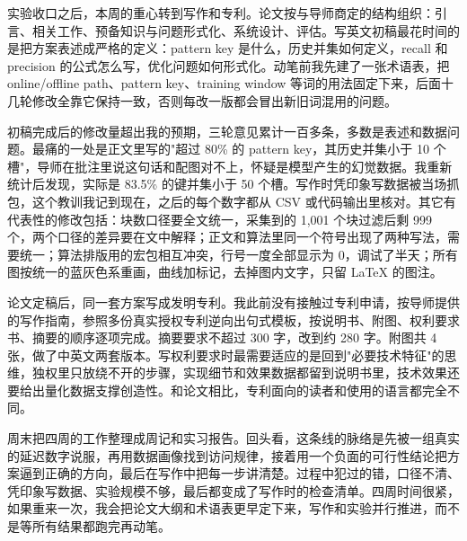 \documentclass[UTF8,fontset=fandol]{ctexart}
\begin{document}

实验收口之后，本周的重心转到写作和专利。论文按与导师商定的结构组织：引言、相关工作、预备知识与问题形式化、系统设计、评估。写英文初稿最花时间的是把方案表述成严格的定义：pattern key 是什么，历史并集如何定义，recall 和 precision 的公式怎么写，优化问题如何形式化。动笔前我先建了一张术语表，把 online/offline path、pattern key、training window 等词的用法固定下来，后面十几轮修改全靠它保持一致，否则每改一版都会冒出新旧词混用的问题。

初稿完成后的修改量超出我的预期，三轮意见累计一百多条，多数是表述和数据问题。最痛的一处是正文里写的"超过 80\% 的 pattern key，其历史并集小于 10 个槽"，导师在批注里说这句话和配图对不上，怀疑是模型产生的幻觉数据。我重新统计后发现，实际是 83.5\% 的键并集小于 50 个槽。写作时凭印象写数据被当场抓包，这个教训我记到现在，之后的每个数字都从 CSV 或代码输出里核对。其它有代表性的修改包括：块数口径要全文统一，采集到的 1,001 个块过滤后剩 999 个，两个口径的差异要在文中解释；正文和算法里同一个符号出现了两种写法，需要统一；算法排版用的宏包相互冲突，行号一度全部显示为 0，调试了半天；所有图按统一的蓝灰色系重画，曲线加标记，去掉图内文字，只留 LaTeX 的图注。

论文定稿后，同一套方案写成发明专利。我此前没有接触过专利申请，按导师提供的写作指南，参照多份真实授权专利逆向出句式模板，按说明书、附图、权利要求书、摘要的顺序逐项完成。摘要要求不超过 300 字，改到约 280 字。附图共 4 张，做了中英文两套版本。写权利要求时最需要适应的是回到"必要技术特征"的思维，独权里只放绕不开的步骤，实现细节和效果数据都留到说明书里，技术效果还要给出量化数据支撑创造性。和论文相比，专利面向的读者和使用的语言都完全不同。

周末把四周的工作整理成周记和实习报告。回头看，这条线的脉络是先被一组真实的延迟数字说服，再用数据画像找到访问规律，接着用一个负面的可行性结论把方案逼到正确的方向，最后在写作中把每一步讲清楚。过程中犯过的错，口径不清、凭印象写数据、实验规模不够，最后都变成了写作时的检查清单。四周时间很紧，如果重来一次，我会把论文大纲和术语表更早定下来，写作和实验并行推进，而不是等所有结果都跑完再动笔。
\end{document}
